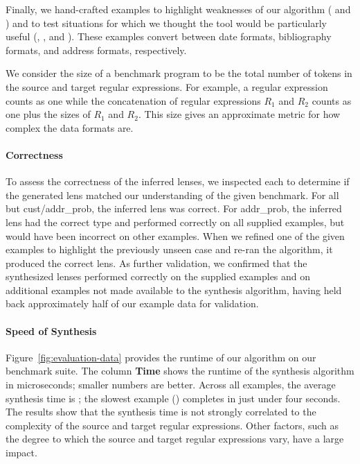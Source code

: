 \documentclass[numbers,10pt,preprint\ifanon ,nocopyrightspace\fi]{sigplanconf}
\begin{document}
Finally, we hand-crafted examples to highlight weaknesses of
our algorithm ( and ) 
and to test situations for which we thought the tool would be
particularly useful (, ,
and ).   These examples convert between date
formats, bibliography formats, and address formats, respectively.


We consider the size of a benchmark program to be the total number of
tokens in the source and target regular expressions.  
For example, a \BaseRegexType{} regular expression counts as one
while the concatenation of regular expressions $R_1$ and $R_2$ counts
as one plus the sizes of $R_1$ and $R_2$.
This size gives an approximate metric for how complex the data formats are.



\paragraph*{Correctness}
To assess the correctness of the inferred lenses, we inspected each to
determine if the generated lens matched our understanding of the given
benchmark.  For all but cust/addr\_prob, the inferred lens was correct.
For addr\_prob, the inferred lens had the correct type and performed
correctly on all supplied examples, but would have been incorrect on
other examples.  When we refined one of the given examples to
highlight the previously unseen case and re-ran the algorithm, it
produced the correct lens. As further validation, we confirmed that the
synthesized lenses performed correctly on the supplied examples and on
additional examples not made available to the synthesis algorithm,
having held back approximately half of our example data for validation.


\paragraph*{Speed of Synthesis}
%
Figure~\ref{fig:evaluation-data} provides the runtime of our algorithm on our
benchmark suite. The column \textbf{Time} shows the runtime of the
synthesis algorithm in microseconds; smaller numbers are better.
Across all examples, the average synthesis time is ; the slowest example () completes in just under four 
seconds. 
The results show that the synthesis time is not strongly correlated
to the complexity of the source and target regular expressions.  Other
factors, such as the degree to which the source and target regular
expressions vary, have a large impact.
\end{document}
